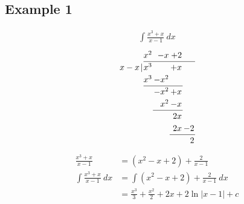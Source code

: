 \documentclass{article}
\theoremstyle{mytheoremstyle}
\theoremstyle{mytheoremstyle}
\theoremstyle{myproblemstyle}
\begin{document}
    \subsection*{Example 1}
    \begin{align*}
        \int \frac{x^3+x}{x-1} \ dx
    \end{align*}
    \begin{align*}
        \arraycolsep=1pt
        \renewcommand\arraystretch{1.2}
        \begin{array}{*1r @{\hskip\arraycolsep}c@{\hskip\arraycolsep} *{11}r}
                  &   & x^2 & -x   & +2 &   \\
              \cline{3-6}
            x  -x & | & x^3 &      & +x &   \\
                  &   & x^3 & -x^2 &    &   \\
                  \cline{3-5}
                  &   &     & -x^2 & +x &   \\
                  &   &     &  x^2 & -x &   \\
                  \cline{4-5}
                  &   &     &     & 2x &    \\
                  &   &     &     & 2x & -2 \\
                  \cline{5-6}
                  &   &     &     &    & 2  \\
        \end{array}
    \end{align*}
    \begin{align*}
        \frac{x^3+x}{x-1} &= (x^2-x+2)+\frac{2}{x-1} \\
        \int \frac{x^3+x}{x-1} \ dx
        &= \int (x^2-x+2)+\frac{2}{x-1} \ dx \\
        &= \frac{x^3}{3} + \frac{x^2}{2} + 2x + 2\ln|x-1| + c
    \end{align*}
\end{document}
